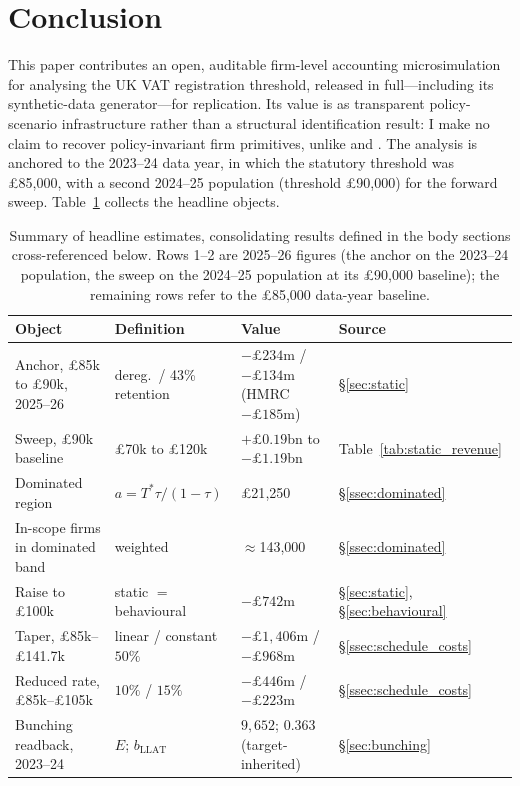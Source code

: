 \section{Conclusion}
\label{sec:conclusion}

This paper contributes an open, auditable firm-level accounting microsimulation for
analysing the UK VAT registration threshold, released in full---including its
synthetic-data generator---for replication. Its value is as transparent policy-scenario
infrastructure rather than a structural identification result: I make no claim to
recover policy-invariant firm primitives, unlike \citet{garicano2016} and
\citet{gourioroys2014}. The analysis is anchored to the 2023--24 data year, in
which the statutory threshold was \pounds85{,}000, with a second 2024--25
population (threshold \pounds90{,}000) for the forward sweep.
Table~\ref{tab:summary} collects the headline objects.

\begin{table}[t]
\centering
\caption{Summary of headline estimates, consolidating results defined in the
body sections cross-referenced below. Rows 1--2 are 2025--26 figures (the
anchor on the 2023--24 population, the sweep on the 2024--25 population at its
\pounds90{,}000 baseline); the remaining rows refer to the \pounds85{,}000
data-year baseline.}
\label{tab:summary}
\small
\begin{tabularx}{\textwidth}{@{}>{\raggedright\arraybackslash}p{}>{\raggedright\arraybackslash}p{}Xl@{}}
\toprule
Object & Definition & Value & Source \\
\midrule
Anchor, \pounds85k to \pounds90k, 2025--26 & dereg.\ / 43\% retention & $-\pounds234$m / $-\pounds134$m (HMRC $-\pounds185$m) & \S\ref{sec:static} \\
Sweep, \pounds90k baseline & \pounds70k to \pounds120k & $+\pounds0.19$bn to $-\pounds1.19$bn & Table~\ref{tab:static_revenue} \\
Dominated region & $a=T^{*}\tau/(1-\tau)$ & \pounds21{,}250 & \S\ref{ssec:dominated} \\
In-scope firms in dominated band & weighted & $\approx$143{,}000 & \S\ref{ssec:dominated} \\
Raise to \pounds100k & static $=$ behavioural & $-\pounds742$m & \S\ref{sec:static}, \S\ref{sec:behavioural} \\
Taper, \pounds85k--\pounds141.7k & linear / constant $50\%$ & $-\pounds1{,}406$m / $-\pounds968$m & \S\ref{ssec:schedule_costs} \\
Reduced rate, \pounds85k--\pounds105k & $10\%$ / $15\%$ & $-\pounds446$m / $-\pounds223$m & \S\ref{ssec:schedule_costs} \\
Bunching readback, 2023--24 & $E$; $b_{\mathrm{LLAT}}$ & $9{,}652$; $0.363$ (target-inherited) & \S\ref{sec:bunching} \\
\bottomrule
\end{tabularx}
\end{table}

